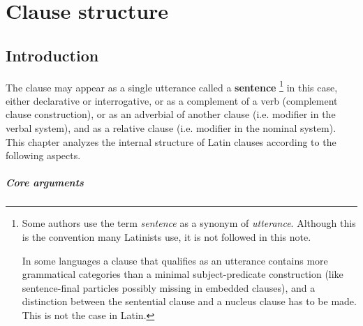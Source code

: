 \documentclass[a4paper, oneside, 12pt]{report}
\newcommand*{\concept}[1]{\textbf{#1}}
\newcommand*{\term}[1]{\emph{#1}}
\begin{document}
\chapter{Clause structure}

\section{Introduction}

The clause may appear as a single utterance called a \concept{sentence}%
\footnote{
    Some authors use the term \term{sentence}
    as a synonym of \term{utterance}.
    Although this is the convention many Latinists use, 
    it is not followed in this note.

    In some languages a clause that qualifies as an utterance 
    contains more grammatical categories than 
    a minimal subject-predicate construction 
    (like sentence-final particles possibly missing in embedded clauses),
    and a distinction between the sentential clause and a nucleus clause 
    has to be made.
    This is not the case in Latin.
}
in this case,
either declarative or interrogative,
or as a complement of a verb (complement clause construction),
or as an adverbial of another clause
(i.e. modifier in the verbal system),
and as a relative clause 
(i.e. modifier in the nominal system).
This chapter analyzes the internal structure of Latin clauses 
according to the following aspects. 

\paragraph*{Core arguments} 
\end{document}
